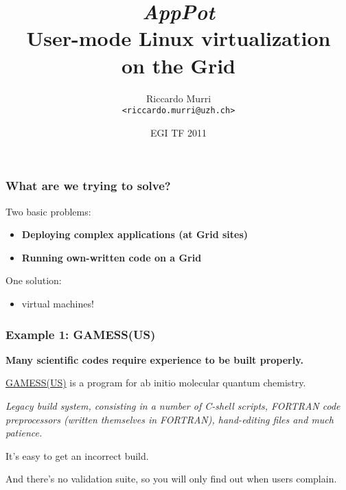 \documentclass{beamer}
\title[AppPot]{%
  \emph{AppPot} 
  \\
  User-mode Linux virtualization \\ on the Grid
}
\author[R.\ Murri]{Riccardo Murri
  \\ \texttt{<riccardo.murri@uzh.ch>}}%
\institute[GC3, University of Zurich]%
{\href{http://www.gc3.uzh.ch/}{Grid Computing Competence Centre}, 
  \\ \href{http://www.uzh.ch/}{University of Zurich}
  \\ \url{http://www.gc3.uzh.ch/}}%
\date{EGI TF 2011}%
\begin{document}
\newcommand{\+}{\vspace{1em}}


\begin{frame}
\maketitle
\end{frame}


\begin{frame}
  \frametitle{What are we trying to solve?}
  \label{sec:1}
  
  Two basic problems:
  \begin{itemize}
  \item \textbf{Deploying complex applications (at Grid sites)}
  \item \textbf{Running own-written code on a Grid}
  \end{itemize}

  \+
  One solution:
  \begin{itemize}
  \item virtual machines!
  \end{itemize}
\end{frame}


  


\begin{frame}
  \frametitle{Example 1: GAMESS(US)}
  \label{sec:3}
  
  \textbf{Many scientific codes require experience to be built properly.}

  \+
  \href{http://www.msg.ameslab.gov/gamess/}{GAMESS(US)} is a program
  for ab initio molecular quantum chemistry.

  \+
  \emph{Legacy build system, consisting in a number of C-shell scripts,
  FORTRAN code preprocessors (written themselves in FORTRAN),
  hand-editing files and much patience.}

  \+
  It's easy to get an incorrect build.

  \+
  And there's no validation suite, so you will only find out when
  users complain.
\end{frame}
\end{document}
